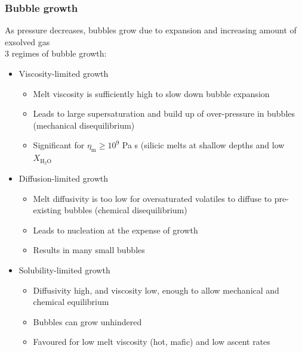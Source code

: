 \documentclass{beamer}
\begin{document}
\begin{frame}
  \frametitle{Bubble growth}

  \footnotesize As pressure decreases, bubbles grow due to expansion and increasing amount of exsolved gas \\

  3 regimes of bubble growth:

  \begin{itemize}
  \item Viscosity-limited growth
    \begin{itemize}
      \footnotesize 
      \item Melt viscosity is sufficiently high to slow down bubble expansion \\
      \item Leads to large supersaturation and build up of over-pressure in bubbles (mechanical disequilibrium) \\
      \item Significant for $\eta_{\text{m}} \geq 10^{9}$ Pa s (silicic melts at shallow depths and low $X_{\text{H}_{2}\text{O}}$ \\
    \end{itemize}

  \item Diffusion-limited growth
    \begin{itemize}
    \footnotesize
    \item Melt diffusivity is too low for oversaturated volatiles to diffuse to pre-existing bubbles (chemical disequilibrium) \\
    \item Leads to nucleation at the expense of growth \\
    \item Results in many small bubbles \\
    \end{itemize}

  \item Solubility-limited growth
    \begin{itemize}
    \footnotesize
    \item Diffusivity high, and viscosity low, enough to allow mechanical and chemical equilibrium \\
    \item Bubbles can grow unhindered \\
    \item Favoured for low melt viscosity (hot, mafic) and low ascent rates \\
    \end{itemize}
  \end{itemize}
\end{frame}
\end{document}
